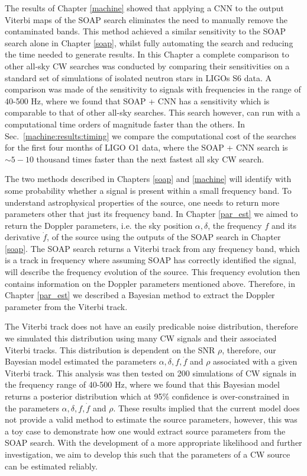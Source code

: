 The results of Chapter \ref{machine} showed that applying a \gls{CNN} to the output
Viterbi maps of the SOAP search eliminates the need to manually remove the
contaminated bands.  This method achieved a similar sensitivity to the SOAP
search alone in Chapter \ref{soap}, whilst fully automating the search and
reducing the time needed to generate results.  In this Chapter a complete
comparison to other all-sky \gls{CW}
searches was conducted by comparing their sensitivities on a standard set of
simulations of isolated neutron stars in \glspl{LIGO} S6 data.  A comparison
was made of the sensitivity to signals with frequencies in the range of 40-500
Hz, where we found that SOAP + \gls{CNN} has a sensitivity which is comparable to that of other all-sky searches.
This search however, can run with a computational time orders of magnitude
faster than the others. In Sec.~\ref{machine:results:timing} we
compare the computational cost of the searches for the first four months of
\gls{LIGO} O1 data, where the SOAP + \gls{CNN} search is $\sim 5 - 10$ thousand
times faster than the next fastest all sky \gls{CW} search.

\bigskip

The two methods described in Chapters \ref{soap} and \ref{machine} will
identify with some probability whether a signal is present within a small
frequency band.  To understand astrophysical properties of the source, one
needs to return more parameters other that just its frequency band.  In Chapter
\ref{par_est} we aimed to return the Doppler parameters, i.e. the sky position
$\alpha, \delta$, the frequency $f$ and its derivative $\dot{f}$, of the source
using the outputs of the SOAP search in Chapter \ref{soap}.  The SOAP search
returns a Viterbi track from any frequency band, which is a track in frequency
where assuming SOAP has correctly identified the signal, will describe the
frequency evolution of the source.  This frequency evolution then contains
information on the Doppler parameters mentioned above.  Therefore, in Chapter
\ref{par_est} we described a Bayesian method to extract the Doppler parameter
from the Viterbi track.

The Viterbi track does not have an easily predicable noise distribution,
therefore we simulated this distribution using many \gls{CW} signals and their
associated Viterbi tracks.  This distribution is dependent on the \gls{SNR}
$\rho$, therefore, our Bayesian model estimated the parameters $\alpha, \delta,
f, \dot{f}$ and $\rho$ associated with a given Viterbi track.  This analysis
was then tested on 200 simulations of \gls{CW} signals in the frequency range
of 40-500 Hz, where we found that this Bayesian model returns a posterior
distribution which at 95\% confidence is over-constrained in the parameters
$\alpha,\delta,f,\dot{f}$ and $\rho$.  These results implied that the current
model does not provide a valid method to estimate the source parameters,
however, this was a toy case to demonstrate how one would extract source
parameters from the SOAP search.  With the development of a more appropriate
likelihood and further investigation, we aim to develop this such that the
parameters of a \gls{CW} source can be estimated reliably.

